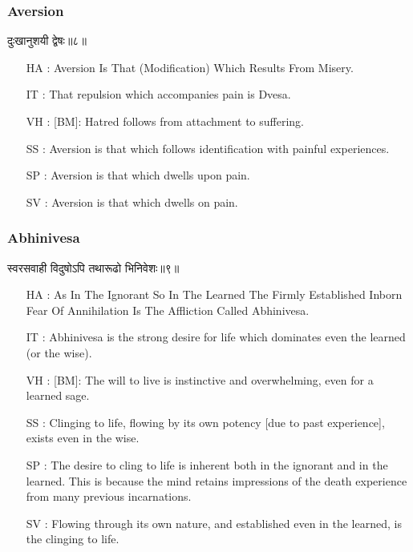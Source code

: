 \begin{frame}[fragile]\frametitle{Aversion}
\begin{sanskrit}
दुःखानुशयी द्वेषः॥८॥
\end{sanskrit}

	\begin{itemize}
	\item [HA]: Aversion Is That (Modification) Which Results From Misery.
	\item [IT]: That repulsion which accompanies pain is Dvesa.
	\item [VH]: [BM]: Hatred follows from attachment to suffering.
	\item [SS]: Aversion is that which follows identification with painful experiences.
	\item [SP]: Aversion is that which dwells upon pain.
	\item [SV]: Aversion is that which dwells on pain. 
	\end{itemize}
\end{frame}



\begin{frame}[fragile]\frametitle{Abhinivesa}
\begin{sanskrit}
स्वरसवाही विदुषोऽपि तथारूढो भिनिवेशः॥९॥
\end{sanskrit}

	\begin{itemize}
	\item [HA]: As In The Ignorant So In The Learned The Firmly Established Inborn Fear Of Annihilation Is The Affliction Called Abhinivesa.
	\item [IT]: Abhinivesa is the strong desire for life which dominates even the learned (or the wise).
	\item [VH]: [BM]: The will to live is instinctive and overwhelming, even for a learned sage.
	\item [SS]: Clinging to life, flowing by its own potency [due to past experience], exists even in the wise.
	\item [SP]: The desire to cling to life is inherent both in the ignorant and in the learned. This is because the mind retains impressions of the death experience from many previous incarnations.
	\item [SV]: Flowing through its own nature, and established even in the learned, is the clinging to life. 
	\end{itemize}
\end{frame}


